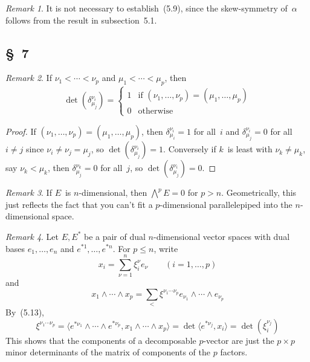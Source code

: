 \documentclass[letterpaper,12pt]{article}
\newcommand{\eprod}{\wedge}
\newcommand{\bigeprod}{\bigwedge}
\newcommand{\medeprod}{{\textstyle\bigeprod}}
\newcommand{\sprod}[2]{\langle#1,#2\rangle}
\newcommand{\multi}[4]{#2_{#3}#1\cdots#1#2_{#4}}
\newcommand{\eprods}[3]{\multi{\eprod}{#1}{#2}{#3}}
\theoremstyle{definition}
\theoremstyle{remark}
\newtheorem*{rmk}{Remark}
\begin{document}
\begin{rmk}
It is not necessary to establish~(5.9), since the skew-symmetry of~\(\alpha\) follows from the result in subsection~5.1.
\end{rmk}

\subsection*{\S~7}
\begin{rmk}
If \(\nu_1<\cdots<\nu_p\) and \(\mu_1<\cdots<\mu_p\), then
\[\det(\delta^{\nu_i}_{\mu_j})=\begin{cases}
1&\text{if }(\nu_1,\ldots,\nu_p)=(\mu_1,\ldots,\mu_p)\\
0&\text{otherwise}
\end{cases}\]
\end{rmk}
\begin{proof}
If \((\nu_1,\ldots,\nu_p)=(\mu_1,\ldots,\mu_p)\), then \(\delta^{\nu_i}_{\mu_i}=1\) for all~\(i\) and \(\delta^{\nu_i}_{\mu_j}=0\) for all \(i\ne j\) since \(\nu_i\ne\nu_j=\mu_j\), so \(\det(\delta^{\nu_i}_{\mu_j})=1\). Conversely if \(k\)~is least with \(\nu_k\ne\mu_k\), say \(\nu_k<\mu_k\), then \(\delta^{\nu_k}_{\mu_j}=0\) for all~\(j\), so \(\det(\delta^{\nu_i}_{\mu_j})=0\).
\end{proof}

\begin{rmk}
If \(E\)~is \(n\)-dimensional, then \(\medeprod^p E=0\) for \(p>n\). Geometrically, this just reflects the fact that you can't fit a \(p\)-dimensional parallelepiped into the \(n\)-dimensional space.
\end{rmk}

\begin{rmk}
Let \(E,E^*\) be a pair of dual \(n\)-dimensional vector spaces with dual bases \(e_1,\ldots,e_n\) and \(e^{*1},\ldots,e^{*n}\). For \(p\le n\), write
\[x_i=\sum_{\nu=1}^n\xi_i^{\nu}e_{\nu}\qquad(i=1,\ldots,p)\]
and
\[\eprods{x}{1}{p}=\sum_{<}\xi^{\nu_1\cdots\nu_p}\eprods{e}{\nu_1}{\nu_p}\]
By~(5.13),
\[\xi^{\nu_1\cdots\nu_p}=\sprod{e^{*\nu_1}\eprod\cdots\eprod e^{*\nu_p}}{\eprods{x}{1}{p}}=\det\sprod{e^{*\nu_j}}{x_i}=\det(\xi_i^{\nu_j})\]
This shows that the components of a decomposable \(p\)-vector are  just the \(p\times p\) minor determinants of the matrix of components of the \(p\) factors.
\end{rmk}
\end{document}
